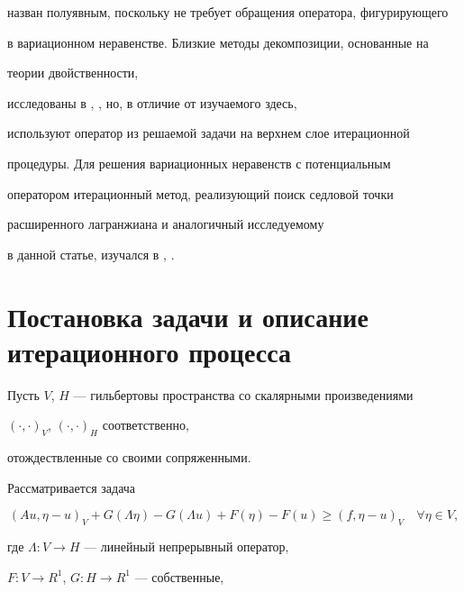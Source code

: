 назван полуявным, поскольку не требует обращения оператора, фигурирующего


в вариационном неравенстве. Близкие методы декомпозиции, основанные на 


теории двойственности, 


исследованы в \cite{GM_76}, \cite{FG_83}, но, в отличие от изучаемого здесь,


используют оператор из решаемой задачи на верхнем слое итерационной 


процедуры. Для решения вариационных неравенств с потенциальным


оператором итерационный метод, реализующий поиск седловой точки


расширенного лагранжиана и аналогичный исследуемому


в данной статье, изучался в \cite{BZ_IV_03}, \cite{BZ_DU_02}. 











\section{Постановка задачи и описание итерационного процесса}





Пусть $V$, $H$ --- гильбертовы пространства со скалярными произведениями


$(\cdot,\cdot)_V$, $(\cdot,\cdot)_H$ соответственно, 


отождествленные со своими сопряженными. 





Рассматривается задача 


\begin{equation}


(A u , \eta-u)_V+G (\Lambda \eta)-G (\Lambda u)+


F (\eta)-F (u) \geq (f , \eta-u)_V 


\quad \forall \eta \in V,


\label{bz_03}


\end{equation}


где $\Lambda : V \to H$ --- линейный непрерывный оператор, 


$F: V \to R^1$, $G: H \to R^1$ --- собственные, 



